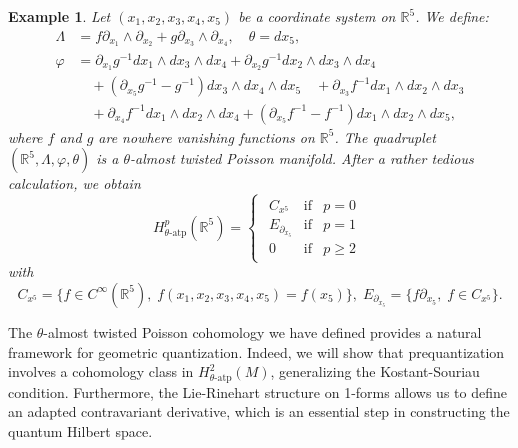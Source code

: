 \documentclass[a4paper,10pt]{article}
\numberwithin{equation}{section}
\theoremstyle{plain}
\newtheorem{example}{Example}
\begin{document}
\begin{example}

			Let  $(x_1,x_2,x_3,x_4,x_5)$ be a   coordinate system on  $\mathbb{R}^5$. We define:
			\begin{align*}
				\Lambda &= f \partial_{x_1} \wedge \partial_{x_2} + g \partial_{x_3} \wedge \partial_{x_4},\quad \theta = dx_5,\\
				\varphi &= \partial_{x_1} g^{-1} dx_1 \wedge dx_3 \wedge dx_4 + \partial_{x_2} g^{-1} dx_2 \wedge dx_3 \wedge dx_4
				\\ &\quad+ (\partial_{x_5} g^{-1} - g^{-1}) dx_3 \wedge dx_4 \wedge dx_5
				\quad + \partial_{x_3} f^{-1} dx_1 \wedge dx_2 \wedge dx_3 \\ &\quad+ \partial_{x_4} f^{-1} dx_1 \wedge dx_2 \wedge dx_4
				+ (\partial_{x_5} f^{-1} - f^{-1}) dx_1 \wedge dx_2 \wedge dx_5,
			\end{align*}
			where $f$ and $g$ are nowhere vanishing functions on $\mathbb{R}^5$. The quadruplet $(\mathbb{R}^5,\Lambda,\varphi,\theta)$ is a  $\theta$-almost twisted Poisson manifold. After a rather tedious calculation, we obtain
			\begin{equation*}
				H_{\theta\text{-atp}}^p(\mathbb{R}^5) =\begin{cases}
					\begin{array}{lcl}
						C_{x^5}&\text{if} &p=0\\
						E_{\partial_{x_5}}&\text{if}& p=1\\
						0& \text{if}& p \geq 2
					\end{array}
				\end{cases}
			\end{equation*}
			with
			$$C_{x^5}=\{f\in C^\infty(\mathbb{R}^5), \;f(x_1,x_2,x_3,x_4,x_5)=f(x_5)\},\;  E_{\partial_{x_5}}= \{f \partial_{x_5},\; f \in C_{x^5}\}.$$
\end{example}			



The $\theta$-almost twisted Poisson cohomology we have defined provides a natural framework for geometric quantization. Indeed, we will show that prequantization involves a cohomology class in $H_{\theta\text{-atp}}^2(M)$, generalizing the Kostant-Souriau condition. Furthermore, the Lie-Rinehart structure on 1-forms allows us to define an adapted contravariant derivative, which is an essential step in constructing the quantum Hilbert space.
\end{document}
